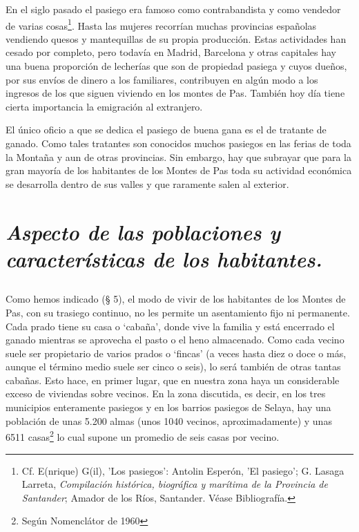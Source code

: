 En el siglo pasado el pasiego era famoso como contrabandista y como vendedor de varias cosas\footnote{Cf. E(nrique) G(il), 'Los pasiegos': Antolin Esperón, 'El pasiego'; G. Lasaga Larreta, \emph{Compilación histórica, biográfica y marítima de la Provincia de Santander}; Amador de los Ríos, Santander. Véase Bibliografía.}. Hasta las mujeres recorrían muchas provincias españolas vendiendo quesos y mantequillas de su propia producción. Estas actividades han cesado por completo, pero todavía en Madrid, Barcelona y otras capitales hay una buena proporción de lecherías que son de propiedad pasiega y cuyos dueños, por sus envíos de dinero a los familiares, contribuyen en algún modo a los ingresos de los que siguen viviendo en los montes de Pas. También hoy día tiene cierta importancia la emigración al extranjero.


El único oficio a que se dedica el pasiego de buena gana es el de tratante de ganado. Como tales tratantes son conocidos muchos pasiegos en las ferias de toda la Montaña y aun de otras provincias. Sin embargo, hay que subrayar que para la gran mayoría de los habitantes de los Montes de Pas toda su actividad económica se desarrolla dentro de sus valles y que raramente salen al exterior. 

\section{\emph{Aspecto de las poblaciones y características de los habitantes.}}
\subsection{} Como hemos indicado (§ 5), el modo de vivir de los habitantes de los Montes de Pas, con su trasiego continuo, no les permite un asentamiento fijo ni permanente. Cada prado tiene su casa o `cabaña', donde vive la familia y está encerrado el ganado mientras se aprovecha el pasto o el heno almacenado. Como cada vecino suele ser propietario de varios prados o `fincas' (a veces hasta diez o doce o más, aunque el término medio suele ser cinco o seis), lo será también de otras tantas cabañas. Esto hace, en primer lugar, que en nuestra zona haya un considerable exceso de viviendas sobre vecinos. En la zona discutida, es decir, en los tres municipios enteramente pasiegos y en los barrios pasiegos de Selaya, hay una población de unas 5.200 almas (unos 1040 vecinos, aproximadamente) y unas 6511 casas\footnote{Según Nomenclátor de 1960} lo cual supone un promedio de seis casas por vecino.


